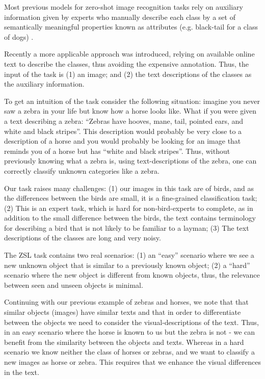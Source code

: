 \documentclass[11pt,a4paper]{article}
\begin{document}
Most previous models for zero-shot image recognition tasks rely on auxiliary information given by experts who manually describe each class by a set of semantically meaningful properties known as attributes (e.g. black-tail for a class of dogs) \citep{farhadi2009describing, lampert2009learning, atzmon2018probabilistic,akata2013label,wang2013unified,changpinyo2016synthesized, akata2015label,ji2018stacked}. \par




Recently a more 
applicable
approach was introduced, relying on available online text to describe the classes, thus avoiding the expensive annotation.
Thus, the input of the task is (1) an image; and (2) the text descriptions of the classes as the auxiliary information. \par

To get an intuition of the task consider the following situation:
imagine you never saw a zebra in your life but know how a horse looks like. What if you were given a text describing a zebra: \enquote{Zebras have hooves, mane, tail, pointed ears, and white and black stripes}. This description would probably be very close to a description of a horse and you would probably be looking for an image that reminds you of a horse but has \enquote{white and black stripes}. Thus, without previously knowing what a zebra is, using text-descriptions of the zebra, one can correctly classify unknown categories like a zebra.

Our task raises many challenges: (1) our images in this task are of birds, and as the differences between the birds are small, it is a fine-grained classification task; (2) This is an expert task, which is hard for non-bird-experts to complete, as in addition to the small difference between the birds, the text contains terminology for describing a bird that is not likely to be familiar to a layman;
(3) The text descriptions of the classes are long and very noisy. \par 


The ZSL task contains two real scenarios: (1) an \enquote{easy} scenario where we see a new unknown object that is similar to a previously known object; (2) a \enquote{hard} scenario where the new object is different from known objects, thus, the relevance between seen and unseen objects is minimal.\par

Continuing with our previous example of zebras and horses, we note that that similar objects (images) have similar texts and that in order to differentiate between the objects we need to consider the visual-descriptions of the text.  Thus, in an easy scenario where the horse is known to us but the zebra is not - we can benefit from the similarity between the objects and texts. Whereas in a hard scenario we know neither the class of horses or zebras, and we want to classify a new images as horse or zebra. This requires that we enhance the visual differences in the text.\par
\end{document}

